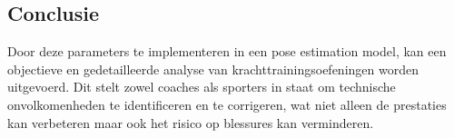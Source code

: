\subsection{Conclusie}
Door deze parameters te implementeren in een pose estimation model, kan een objectieve en gedetailleerde analyse van krachttrainingsoefeningen worden uitgevoerd. Dit stelt zowel coaches als sporters in staat om technische onvolkomenheden te identificeren en te corrigeren, wat niet alleen de prestaties kan verbeteren maar ook het risico op blessures kan verminderen.

